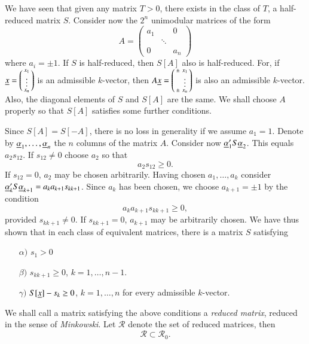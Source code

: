We have seen that given any matrix $T > 0$, there exists in the class
of $T$, a half-reduced matrix $S$. Consider now the $2^{n}$ unimodular
matrices of the form
$$
A=
\begin{pmatrix}
a_{1} & & 0\\
 &\ddots &\\
0 & & a_{n}
\end{pmatrix}
$$
where $a_{i}=\pm 1$. If $S$ is half-reduced, then $S[A]$ also is
half-reduced. For, if $\underline{x}=\left(\begin{smallmatrix}
  x_{1}\\ \vdots\\ x_{n}\end{smallmatrix}\right)$ is an admissible
$k$-vector, then $A\underline{x}=\left(\begin{smallmatrix} \pm & x_{1}\\  &
  \vdots\\ \pm & x_{n}\end{smallmatrix}\right)$ is also an admissible
$k$-vector. Also, the diagonal elements of $S$ and $S[A]$ are the
same. We shall choose $A$ properly so that $S[A]$ satisfies some
further conditions.

Since $S[A]=S[-A]$, there is no loss in generality if we assume
$a_{1}=1$. Denote by $\underline{\alpha}_{1},\ldots,\underline{\alpha}_{n}$ the $n$
columns of the matrix $A$. Consider now
$\underline{\alpha}'_{1} S\underline{\alpha}_{2}$. This equals $a_{2}s_{12}$. If
$s_{12}\neq 0$ choose $a_{2}$ so that
$$
a_{2}s_{12}\geq 0.
$$
If $s_{12}=0$, $a_{2}$ may be chosen arbitrarily. Having chosen
$a_{1},\ldots,a_{k}$ consider
$\underline{\alpha}'_{k}S\underline{\alpha}_{k+1}=a_{k}a_{k+1}s_{kk+1}$. Since
$a_{k}$ has been chosen, we choose $a_{k+1}=\pm 1$ by the condition 
$$
a_{k}a_{k+1}s_{kk+1}\geq 0,
$$\pageoriginale
provided $s_{kk+1}\neq 0$. If $s_{kk+1}=0$, $a_{k+1}$ may be
arbitrarily chosen. We have thus shown that in each class of
equivalent matrices, there is a matrix $S$ satisfying
\begin{itemize}
\item[$\alpha)$] $s_{1}>0$

\item[$\beta)$] $s_{kk+1}\geq 0$, $k=1,\ldots,n-1$.

\item[$\gamma)$] $S[\underline{x}]-s_{k}\geq 0$, $k=1,\ldots,n$ for every
  admissible $k$-vector.
\end{itemize}

We shall call a matrix satisfying the above conditions a {\em reduced
  matrix}, reduced in the sense of {\em Minkowski}. Let $\mathscr{R}$
denote the set of reduced matrices, then
\begin{equation*}
\mathscr{R}\subset \mathscr{R}_{0}.\tag{56}\label{c2:eq56}
\end{equation*}

